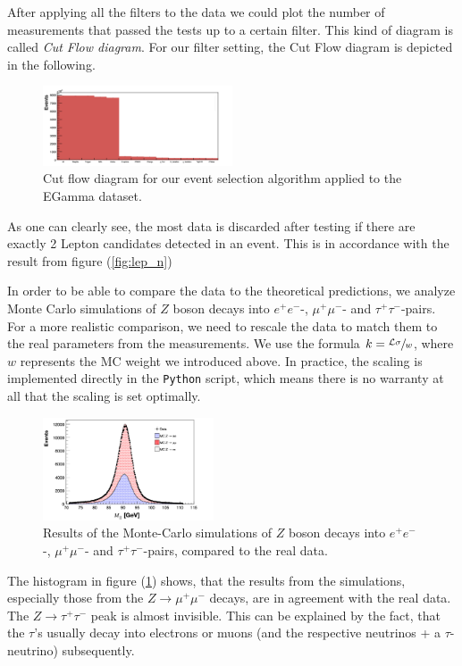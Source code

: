 \documentclass[twocolumn,
			   showpacs,%
               nofootinbib,
               aps,%
               prd,
               notitlepage,
               showkeys,
               10pt]{revtex4-1}
\begin{document}
After applying all the filters to the data we could plot the number of measurements that passed the tests up to a certain  filter. This kind of diagram is called \textit{Cut Flow diagram}. For our filter setting, the Cut Flow diagram is depicted in the following.

\begin{figure}[H]
\centering
\includegraphics[width = 0.5\textwidth]
{figures/plots/CutFlowEGamma_corr}
\caption{Cut flow diagram for our event selection algorithm applied to the EGamma dataset.}	
\end{figure}
As one can clearly see, the most data is discarded after testing if there are exactly 2 Lepton candidates detected in an event. This is in accordance with the result from figure (\ref{fig:lep_n})

In order to be able to compare the data to the theoretical predictions, we analyze Monte Carlo simulations of $Z$ boson decays into $e^+e^-$-, $\mu^+\mu^-$- and $\tau^+\tau^-$-pairs. \\
For a more realistic comparison, we need to rescale the data to match them to the real parameters from the measurements. We use the formula $k = \sfrac{\mathcal{L}\sigma}{w}$, where $w$ represents the MC weight we introduced above. In practice, the scaling is implemented directly in the \verb|Python| script, which means there is no warranty at all that the scaling is set optimally. \\
\begin{figure}[H]
	\centering
	\includegraphics[width=0.45\textwidth]{figures/plots/HistoMCData_corr}
	\caption{Results of the Monte-Carlo simulations of $Z$ boson decays into $e^+e^-$-, $\mu^+\mu^-$- and $\tau^+\tau^-$-pairs, compared to the real data.}
	\label{fig:MChisto}
\end{figure}
The histogram in figure (\ref{fig:MChisto}) shows, that the results from the simulations, especially those from the $Z\rightarrow \mu^+\mu^-$ decays, are in agreement with the real data. The $Z\rightarrow \tau^+\tau^-$ peak is almost invisible. This can be explained by the fact, that the $\tau$'s usually decay into electrons or muons (and the respective neutrinos + a $\tau$-neutrino) subsequently.
\end{document}

